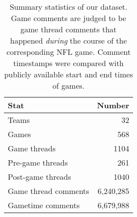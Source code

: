 \begin{table}[t]
    \centering
    \begin{tabular}{lr}
        \toprule
        \textbf{Stat} & \textbf{Number} \\\midrule
        Teams & 32 \\ \midrule
        Games & 568 \\ \midrule
        Game threads & 1104 \\ \midrule
        Pre-game threads & 261 \\ \midrule
        Post-game threads & 1040 \\ \midrule
        Game thread comments  & 6,240,285 \\ \midrule
        Gametime comments & 6,679,988 \\ \bottomrule
    \end{tabular}
    \caption{Summary statistics of our dataset. Game comments are judged to be game thread comments that happened \emph{during} the course of the corresponding NFL game. Comment timestamps were compared with publicly available start and end times of games.}
    \label{tab:football-stats}
\end{table}
